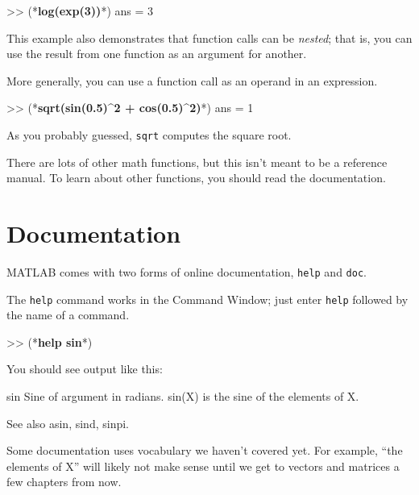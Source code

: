 \begin{code}
>> (*\textbf{log(exp(3))}*)
ans = 3
\end{code}

This example also demonstrates that function calls can be \emph{nested};
that is, you can use the result from one function as an argument for
another.


More generally, you can use a function call as an operand in an expression.

\begin{code}
>> (*\textbf{sqrt(sin(0.5)\^{}2 + cos(0.5)\^{}2)}*)
ans = 1
\end{code}

As you probably guessed, \lstinline{sqrt} computes the square root.


There are lots of other math functions, but this isn't meant to
be a reference manual.  To learn about other functions, you should
read the documentation.


\section{Documentation}

MATLAB comes with two forms of online documentation, \lstinline{help}
and \lstinline{doc}.


The \lstinline{help} command works in the Command Window; just 
enter \lstinline{help} followed by the name of a command.


\begin{code}
>> (*\textbf{help sin}*)
\end{code}

You should see output like this:

\begin{stdout}
 sin    Sine of argument in radians.
    sin(X) is the sine of the elements of X.
 
    See also asin, sind, sinpi.
\end{stdout}

Some documentation uses vocabulary we haven't covered yet.  
For example, ``the elements of X'' will likely not make sense until
we get to vectors and matrices a few chapters from now.

